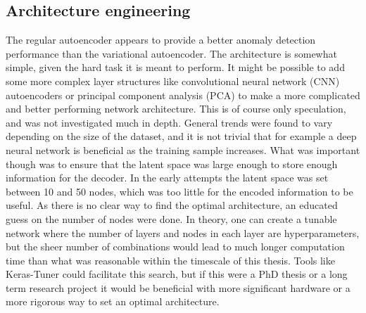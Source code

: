 \subsection*{Architecture engineering}
The regular autoencoder appears to provide a better anomaly detection performance than the variational autoencoder. 
The architecture is somewhat simple, given the hard task it is meant to perform. It might be possible to 
add some more complex layer structures like convolutional neural network (CNN) autoencoders or principal component analysis (PCA) 
to make a more complicated and better performing 
network architecture. This is of course only speculation, and was not investigated much in depth. General trends were 
found to vary depending on the size of the dataset, and it is not trivial that for example a deep neural network is 
beneficial as the training sample increases. What was important though was to ensure that the latent space was large 
enough to store enough information for the decoder. In the early attempts the latent space was set between 10 and 50 
nodes, which was too little for the encoded information to be useful. As there is no clear way to find the optimal 
architecture, an educated guess on the number of nodes were done. In theory, one can create a tunable network where 
the number of layers and nodes in each layer are hyperparameters, but the sheer number of combinations would lead to 
much longer computation time than what was reasonable within the timescale of this thesis. Tools like Keras-Tuner could facilitate 
this search, but if this were a PhD thesis or a long term research project it would be beneficial with more
 significant hardware or a more rigorous way to set an optimal architecture. \par



